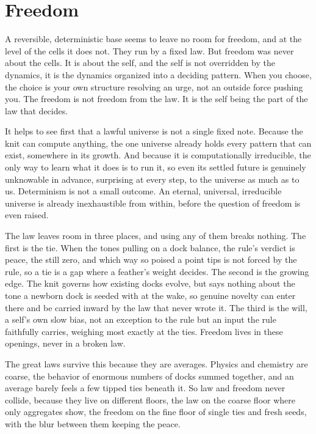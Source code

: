 \section{Freedom}

A reversible, deterministic base seems to leave no room for freedom, and at the level of the cells it does not. They run by a fixed law. But freedom was never about the cells. It is about the self, and the self is not overridden by the dynamics, it is the dynamics organized into a deciding pattern. When you choose, the choice is your own structure resolving an urge, not an outside force pushing you. The freedom is not freedom from the law. It is the self being the part of the law that decides.

It helps to see first that a lawful universe is not a single fixed note. Because the knit can compute anything, the one universe already holds every pattern that can exist, somewhere in its growth. And because it is computationally irreducible, the only way to learn what it does is to run it, so even its settled future is genuinely unknowable in advance, surprising at every step, to the universe as much as to us. Determinism is not a small outcome. An eternal, universal, irreducible universe is already inexhaustible from within, before the question of freedom is even raised.

The law leaves room in three places, and using any of them breaks nothing. The first is the tie. When the tones pulling on a dock balance, the rule's verdict is peace, the still zero, and which way so poised a point tips is not forced by the rule, so a tie is a gap where a feather's weight decides. The second is the growing edge. The knit governs how existing docks evolve, but says nothing about the tone a newborn dock is seeded with at the wake, so genuine novelty can enter there and be carried inward by the law that never wrote it. The third is the will, a self's own slow bias, not an exception to the rule but an input the rule faithfully carries, weighing most exactly at the ties. Freedom lives in these openings, never in a broken law.

The great laws survive this because they are averages. Physics and chemistry are coarse, the behavior of enormous numbers of docks summed together, and an average barely feels a few tipped ties beneath it. So law and freedom never collide, because they live on different floors, the law on the coarse floor where only aggregates show, the freedom on the fine floor of single ties and fresh seeds, with the blur between them keeping the peace.

